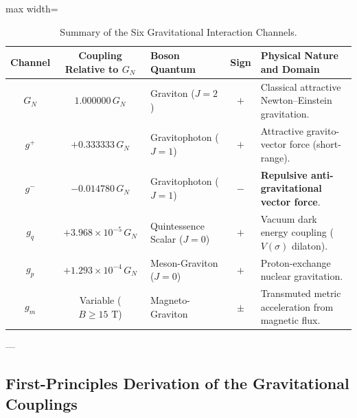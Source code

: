 \documentclass[
    12pt,
    a4paper,
    headings=normal,
    twoside=false,
    open=any,
    parskip=half
]{scrbook}
\begin{document}
\begin{table}[htbp]
\centering
\small
\caption{Summary of the Six Gravitational Interaction Channels.}
\label{tab:ch10_six_gravitational_channels}
\begin{adjustbox}{max width=\textwidth}
\begin{tabular}{cclcl}\toprule
\textbf{Channel} & \textbf{Coupling Relative to $G_N$} & \textbf{Boson Quantum} & \textbf{Sign} & \textbf{Physical Nature and Domain} \\\midrule
\rowcolor{secondarycolor!8}
$G_N$ & $1.000000 \, G_N$ & Graviton ($J=2$) & $+$ & Classical attractive Newton--Einstein gravitation. \\
$g^+$ & $+0.333333 \, G_N$ & Gravitophoton ($J=1$) & $+$ & Attractive gravito-vector force (short-range). \\
\rowcolor{secondarycolor!8}
$g^-$ & $-0.014780 \, G_N$ & Gravitophoton ($J=1$) & $-$ & \textbf{Repulsive anti-gravitational vector force}. \\
$g_q$ & $+3.968 \times 10^{-5} \, G_N$ & Quintessence Scalar ($J=0$) & $+$ & Vacuum dark energy coupling ($V(\sigma)$ dilaton). \\
\rowcolor{secondarycolor!8}
$g_p$ & $+1.293 \times 10^{-4} \, G_N$ & Meson-Graviton ($J=0$) & $+$ & Proton-exchange nuclear gravitation. \\
$g_m$ & Variable ($B \ge 15\text{ T}$) & Magneto-Graviton & $\pm$ & Transmuted metric acceleration from magnetic flux. \\\bottomrule
\end{tabular}
\end{adjustbox}
\end{table}

---

\subsection{First-Principles Derivation of the Gravitational Couplings}
\end{document}
